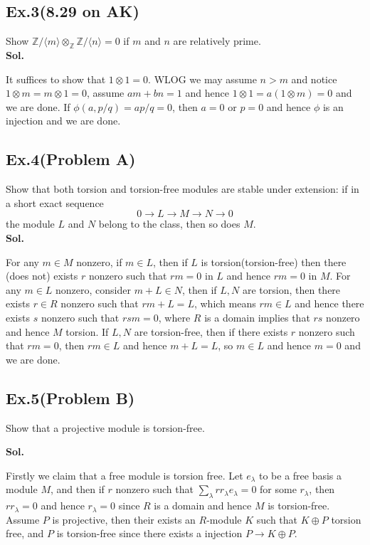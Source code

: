 \documentclass[lang=en,11pt,a4paper,citestyle =authoryear]{elegantpaper}
\begin{document}
\subsection*{Ex.3(8.29 on AK)} 
Show $\mathbb{Z}/\langle m\rangle\otimes_{\mathbb{Z}}\mathbb{Z}/\langle n\rangle = 0$ if $m$ and $n$ are relatively prime.
\vspace{0.5em}\\
\textbf{Sol.} \par
It suffices to show that $1\otimes 1 = 0$. WLOG we may assume $n>m$ and notice $1 \otimes m = m\otimes 1 = 0$, assume $am+bn = 1$ and hence $1\otimes 1 = a(1\otimes m) = 0$ and we are done. If $\phi(a,p/q) = ap/q = 0$, then $a = 0$ or $p=0$ and hence $\phi$ is an injection and we are done.
\par 
\vspace{0.5em}

\subsection*{Ex.4(Problem A)} 
Show that both torsion and torsion-free modules are stable under extension: if in a short exact sequence
\[0\to L\to M \to N \to 0\]
the module $L$ and $N$ belong to the class, then so does $M$.
\vspace{0.5em}\\
\textbf{Sol.} \par
For any $m\in M$ nonzero, if $m\in L$, then if $L$ is torsion(torsion-free) then there (does not) exists $r$ nonzero such that $rm = 0$ in $L$ and hence $rm = 0$ in $M$. For any $m\in L$ nonzero, consider $m+L \in N$, then if $L,N$ are torsion, then there exists $r\in R$ nonzero such that $rm+L = L$, which means $rm \in L$ and hence there exists $s$ nonzero such that $rsm = 0$, where $R$ is a domain implies that $rs$ nonzero and hence $M$ torsion. If $L,N$ are torsion-free, then if there exists $r$ nonzero such that $rm = 0$, then $rm \in L$ and hence $m+L = L$, so $m \in L$ and hence $m = 0$ and we are done.
\par 
\vspace{0.5em}

\subsection*{Ex.5(Problem B)} 
Show that a projective module is torsion-free.
\vspace{0.5em}\par
\textbf{Sol.} \par
Firstly we claim that a free module is torsion free. Let $e_\lambda$ to be a free basis a module $M$, and then if $r$ nonzero such that $\sum\limits_{\lambda} rr_{\lambda}e_{\lambda} = 0$ for some $r_{\lambda}$, then $rr_{\lambda} = 0$ and hence $r_{\lambda} = 0$ since $R$ is a domain and hence $M$ is torsion-free. Assume $P$ is projective, then their exists an $R$-module $K$ such that $K\oplus P$ torsion free, and $P$ is torsion-free since there exists a injection $P\to K\oplus P$.
\par 
\vspace{0.5em}
\end{document}
